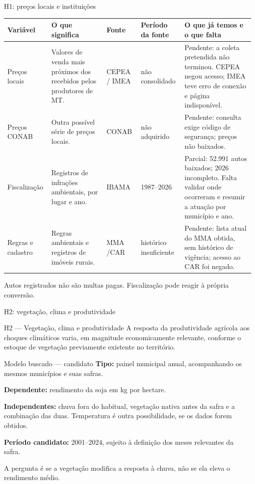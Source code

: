 \documentclass[aspectratio=169,11pt]{beamer}
\newcommand{\fonte}[1]{\par\vfill{\fontsize{7.5}{9}\selectfont\color{gray}#1\par}}
\newcommand{\parcial}{\textcolor{orange!75!black}{Parcial}}
\newcommand{\pend}{\textcolor{red!70!black}{Pendente}}
\begin{document}
\begin{frame}{H1: preços locais e instituições}
\fontsize{9}{11}\selectfont
\setlength{\tabcolsep}{3pt}
\begin{tabularx}{\textwidth}{P{1.9cm} P{3.0cm} P{2.1cm} P{1.7cm} X}
\toprule
\textbf{Variável} & \textbf{O que significa} & \textbf{Fonte} & \textbf{Período da fonte} & \textbf{O que já temos e o que falta} \\
\midrule
Preços locais & Valores de venda mais próximos dos recebidos pelos produtores de MT. & CEPEA / IMEA & não consolidado & \pend: a coleta pretendida não terminou. CEPEA negou acesso; IMEA teve erro de conexão e página indisponível. \\
Preços CONAB & Outra possível série de preços locais. & CONAB & não adquirido & \pend: consulta exige código de segurança; preços não baixados. \\
Fiscalização & Registros de infrações ambientais, por lugar e ano. & IBAMA & 1987--2026 & \parcial: 52.991 autos baixados; 2026 incompleto. Falta validar onde ocorreram e resumir a atuação por município e ano. \\
Regras e cadastro & Regras ambientais e registros de imóveis rurais. & MMA /\newline CAR & histórico insuficiente & \pend: lista atual do MMA obtida, sem histórico de vigência; acesso ao CAR foi negado. \\
\bottomrule
\end{tabularx}
\fonte{Autos registrados não são multas pagas. Fiscalização pode reagir à própria conversão.}
\end{frame}

\begin{frame}{H2: vegetação, clima e produtividade}
\begin{block}{H2 — Vegetação, clima e produtividade}
A resposta da produtividade agrícola aos choques climáticos varia, em magnitude economicamente relevante, conforme o estoque de vegetação previamente existente no território.
\end{block}
\medskip
\begin{block}{Modelo buscado — candidato}
\textbf{Tipo:} painel municipal anual, acompanhando os mesmos municípios e suas safras.\par
\textbf{Dependente:} rendimento da soja em kg por hectare.\par
\textbf{Independentes:} chuva fora do habitual, vegetação nativa antes da safra e a combinação das duas. Temperatura é outra possibilidade, se os dados forem obtidos.\par
\textbf{Período candidato:} 2001--2024, sujeito à definição dos meses relevantes da safra.
\end{block}
\fonte{A pergunta é se a vegetação modifica a resposta à chuva, não se ela eleva o rendimento médio.}
\end{frame}
\end{document}
